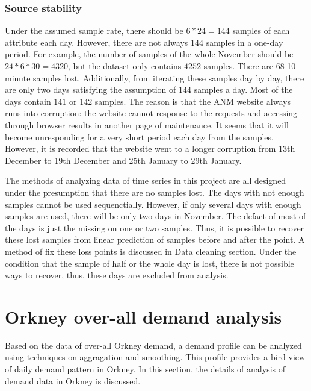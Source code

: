 \documentclass[12pt,a4paper]{report}
\begin{document}
                \subsubsection{Source stability}
                \label{text_source_stability}
                Under the assumed sample rate, there should be $6*24=144$ samples of each attribute each day. However, there are not always 144 samples in a one-day period.
                For example, the number of samples of the whole November should be $24*6*30=4320$, but the dataset only contains $4252$ samples. There are $68$ 10-minute samples
                lost. Additionally, from iterating these samples day by day, there are only two days satisfying the assumption of $144$ samples a day. Most of the days contain
                $141$ or $142$ samples. The reason is that the ANM website always runs into corruption: the website cannot response to the requests and accessing through browser results
                in another page of maintenance. It seems that it will become unresponding for a very short period each day from the samples. However, it is recorded that the website
                went to a longer corruption from 13th December to 19th December and 25th January to 29th January.

                The methods of analyzing data of time series in this project are all designed under the presumption that there are no samples lost. The days with not enough samples cannot be
                used sequenctially. However, if only several days with enough samples are used, there will be only two days in November. The defact of most of the days is just the missing on
                one or two samples. Thus, it is possible to recover these lost samples from linear prediction of samples before and after the point. A method of fix these loss points is discussed
                in Data cleaning section. Under the condition that the sample of half or the whole day is lost, there is not possible ways to recover, thus, these days are excluded from
                analysis.
            
                
        \section{Orkney over-all demand analysis}
        Based on the data of over-all Orkney demand, a demand profile can be analyzed using techniques on aggragation and smoothing. This profile provides a bird view of daily demand pattern in Orkney.
        In this section, the details of analysis of demand data in Orkney is discussed.
\end{document}
